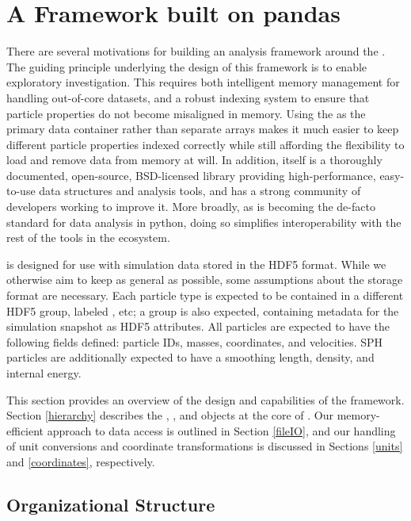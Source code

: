 \section{A Framework built on pandas}
\label{sec:framework}

There are several motivations for building an analysis framework around the . 
The guiding principle underlying the design of this framework is to enable exploratory investigation.
This requires both intelligent memory management for handling out-of-core datasets, and a robust indexing system to ensure that particle properties do not become misaligned in memory.
Using  the  as the primary data container rather than separate  arrays makes it much easier to keep different particle properties indexed correctly while still affording the flexibility to load and remove data from memory at will.
In addition,  itself is a thoroughly documented, open-source, BSD-licensed library providing high-performance, easy-to-use data structures and analysis tools, and has a strong community of developers working to improve it.  
More broadly, as  is becoming the de-facto standard for data analysis in python, doing so simplifies interoperability with the rest of the tools in the ecosystem.

 is designed for use with simulation data stored in the HDF5 format.  
While we otherwise aim to keep  as general as possible, some assumptions about the storage format are necessary.
Each particle type is expected to be contained in a different HDF5 group, labeled , etc; a  group is also expected, containing metadata for the simulation snapshot as HDF5 attributes. 
All particles are expected to have the following fields defined: particle IDs, masses, coordinates, and velocities.  
SPH particles are additionally expected to have a smoothing length, density, and internal energy.  

This section provides an overview of the design and capabilities of the  framework.  
Section \ref{hierarchy} describes the , , and  objects at the core of .  
Our memory-efficient approach to data access is outlined in Section \ref{fileIO}, and our handling of unit conversions and coordinate transformations is discussed in Sections \ref{units} and \ref{coordinates}, respectively.

\subsection{Organizational Structure}
\label{sec:hierarchy}

